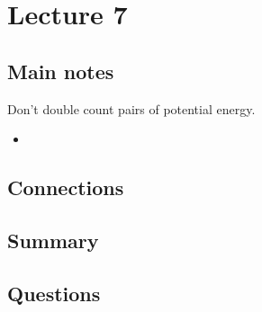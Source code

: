 \section{Lecture 7}

\subsection{Main notes}

Don't double count pairs of potential energy.

\begin{itemize}
	\item
\end{itemize}


\subsection{Connections}


\subsection{Summary}


\subsection{Questions}
